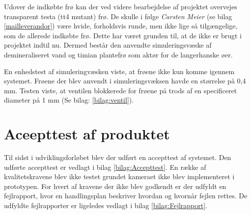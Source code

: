 Udover de indkøbte frø kan der ved videre bearbejdelse af projektet overvejes transparent testa (tt4 mutant) frø. De skulle i følge \textit{Carsten Meier} (se bilag \ref{mailleverandor}) være hvide, forholdsvis runde, men ikke lige så tilgængelige, som de allerede indkøbte frø. Dette har været grunden til, at de ikke er brugt i projektet indtil nu. Dermed består den anvendte simuleringsvæske af demineraliseret vand og timian plantefrø som aktør for de langerhanske øer.  

En enhedstest af simuleringvæsken viste, at frøene ikke kun komme igennem systemet. Frøene der blev anvendt i simuleringsvæksen havde en størrelse på 0,4 mm. Testen viste, at ventilen blokkerede for frøene på trods af en specificeret diameter på 1 mm (Se bilag: \ref{bilag:ventil}). 
 
\section{Aceepttest af produktet} 
Til sidst i udviklingsforløbet blev der udført en accepttest af systemet. Den udførte accepttest er vedlagt i bilag \ref{bilag:Accepttest}. En række af kvalitetskravene blev ikke testet grundet kameraet ikke blev implementeret i prototypen. For hvert af kravene der ikke blev godkendt er der udfyldt en fejlrapport, hvor en handlingsplan beskriver hvordan og hvornår fejlen rettes. De udfyldte fejlrapporter er ligeledes vedlagt i bilag \ref{bilag:Fejlrapport}.

